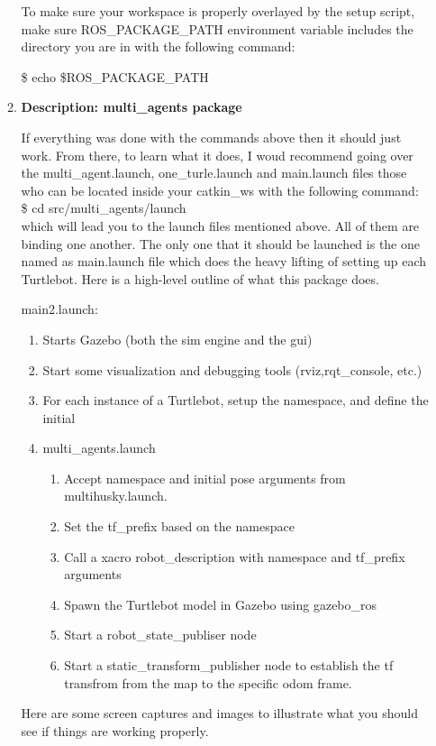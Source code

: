 \documentclass[journal]{IEEEtran}
\begin{document}
\begin{enumerate}
\begin{enumerate}
To make sure your workspace is properly overlayed by the setup script, make sure ROS{\_}PACKAGE{\_}PATH environment variable includes the directory you are in with the following command:

{\$} echo {\$}ROS{\_}PACKAGE{\_}PATH



\item \textbf {Description: multi{\_}agents package}


If everything was done with the commands above then it should just work. From there, to learn what it does, I woud recommend going over the multi{\_}agent.launch, one{\_}turle.launch and main.launch files those who can be located inside your catkin{\_}ws with the following command:\\
{\$} cd src/multi{\_}agents/launch \\
which will lead you to the launch files mentioned above. All of them are binding one another. The only one that it should be launched is the one named as main.launch file which does the heavy lifting of setting up each Turtlebot. Here is a high-level outline of what this package does.

main2.launch:
\begin{enumerate}
\item {Starts Gazebo (both the sim engine and the gui)}
\item {Start some visualization and debugging tools (rviz,rqt{\_}console, etc.)}
\item {For each instance of a Turtlebot, setup the namespace, and define the initial}
\item {multi{\_}agents.launch}

\begin{enumerate}
\item {Accept namespace and initial pose arguments from multihusky.launch}.
\item {Set the tf{\_}prefix based on the namespace}
\item {Call a xacro robot{\_}description with namespace and tf{\_}prefix arguments}
\item {Spawn the Turtlebot model in Gazebo using gazebo{\_}ros}
\item {Start a robot{\_}state{\_}publiser node}
\item {Start a static{\_}transform{\_}publisher node to establish the tf transfrom from the map to the specific odom frame.}
\end{enumerate}
\end{enumerate}
Here are some screen captures and images to illustrate what you should see if things are working properly.
    

\end{enumerate}
\end{enumerate}
\end{document}
